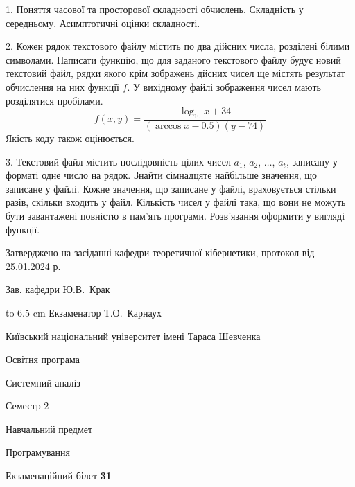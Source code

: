 \documentclass[12pt, ukrainian]{article}
\begin{document}
{%
1. Поняття часової та просторової складності обчислень. Складність у середньому. Асимптотичні оцінки складності.%
\par
\vspace{2mm}

2. Кожен рядок текстового файлу містить по два дійсних числа, розділені білими символами.
Написати функцію, що для заданого текстового файлу будує новий текстовий файл, рядки якого крім зображень дйсних чисел ще містять результат обчислення на них функції $f$. У вихідному файлі зображення чисел мають розділятися пробілами. 
$$f(x, y) =\frac{\log_{10} x + 34}{(\arccos x - 0.5) (y - 74)}$$ 
Якість коду також оцінюється.

\par
\vspace{2mm}

3. Текстовий файл містить послідовність цілих чисел $a_1$, $a_2$, $\ldots$, $a_t$, записану у форматі одне число на рядок. Знайти сімнадцяте найбільше значення, що записане у файлі. Кожне значення, що записане у файлі, враховується стільки разів, скільки входить у файл. Кількість чисел у файлі така, що вони не можуть бути завантажені повністю в пам'ять програми. Розв'язання оформити у вигляді функції.

}
{\smallskip\smallskip \begin {scriptsize} Затверджено на засіданні кафедри теоретичної кібернетики, протокол   від   25.01.2024 р.\par\smallskip\smallskip\smallskip\smallskip
{\parbox {6.5 cm} {Зав. кафедри \dotfill Ю.В.~Крак}}\hspace {0.7cm} {\hbox to 6.5 cm { Екзаменатор \dotfill Т.О.~Карнаух}} \end{scriptsize}}
\newpage
{{\begin {scriptsize}\par
{ \center  Київський національний університет імені Тараса Шевченка \par}
{\parbox {5 cm}{Освітня програма \hfill}{\parbox {7 cm}{Системний аналіз\hfill}}\parbox {6 cm}{\hfill Семестр 2}}\par
{\parbox {5 cm} {Навчальний предмет \hfill}\parbox {7 cm}{Програмування \hfill}\parbox {6cm}{\hfill}\par}\vspace{-15pt} \end{scriptsize}}{\center Екзаменаційний білет \No \textbf { 31 }\par}}
\end{document}
